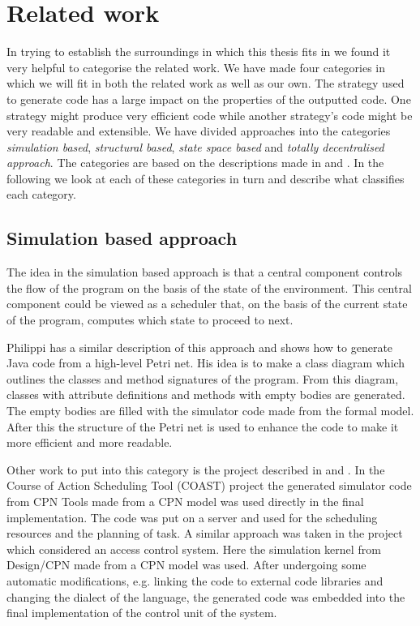 \section{Related work}
\label{sec:relatedwork}
In trying to establish the surroundings in which this thesis fits in we found it very helpful to categorise the related work. We have made four categories in which we will fit in both the related work as well as our own. The strategy used to generate code has a large impact on the properties of the outputted code. One strategy might produce very efficient code while another strategy's code might be very readable and extensible. We have divided approaches into the categories \emph{simulation based}, \emph{structural based}, \emph{state space based} and \emph{totally decentralised approach}. The categories are based on the descriptions made in \cite{RefWorks:4} and \cite{RefWorks:5}. In the following we look at each of these categories in turn and describe what classifies each category.

\subsection{Simulation based approach}
The idea in the simulation based approach is that a central component controls the flow of the program on the basis of the state of the environment. This central component could be viewed as a scheduler that, on the basis of the current state of the program, computes which state to proceed to next.

Philippi \cite{RefWorks:4} has a similar description of this approach and shows how to generate Java code from a high-level Petri net. His idea is to make a class diagram which outlines the classes and method signatures of the program. From this diagram, classes with attribute definitions and methods with empty bodies are generated. The empty bodies are filled with the simulator code made from the formal model. After this the structure of the Petri net is used to enhance the code to make it more efficient and more readable.

Other work to put into this category is the project described in \cite{RefWorks:78} and \cite{RefWorks:2}. In the Course of Action Scheduling Tool (COAST) project \cite{RefWorks:2} the generated simulator code from CPN Tools made from a CPN model was used directly in the final implementation. The code was put on a server and used for the scheduling resources and the planning of task. A similar approach was taken in the project \cite{RefWorks:78} which considered an access control system. Here the simulation kernel from Design/CPN \cite{RefWorks:3} made from a CPN model was used. After undergoing some automatic modifications, e.g. linking the code to external code libraries and changing the dialect of the language, the generated code was embedded into the final implementation of the control unit of the system.

